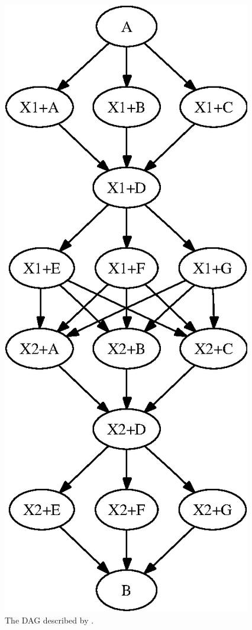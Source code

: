 \begin{figure}
\centering
\includegraphics{user-man/splice-s1}
\caption{\label{fig:dagman-splice-s1} The DAG described by .}
\end{figure}

